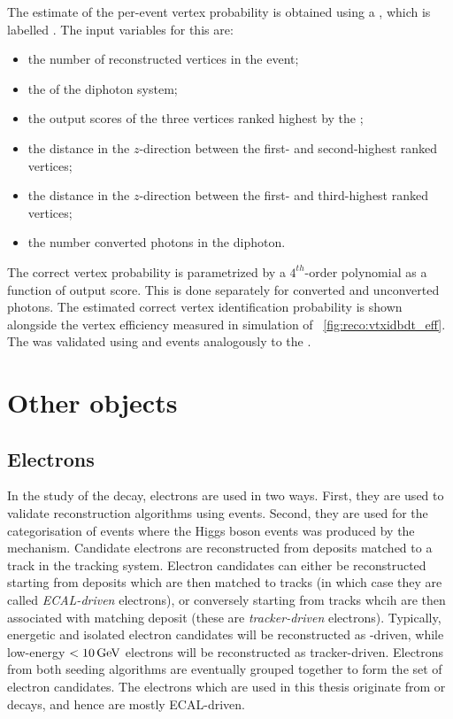 The estimate of the per-event vertex probability is obtained using a \BDT, which is labelled \VtxProbBdt. The input variables for this \BDT are:

\begin{itemize}
\item the number of reconstructed vertices in the event;
\item the \pT of the diphoton system;
\item the output scores of the three vertices ranked highest by the \VtxIdBdt;
\item the distance in the $z$-direction between the first- and second-highest ranked vertices;
\item the distance in the $z$-direction between the first- and third-highest ranked vertices;
\item the number converted photons in the diphoton. 
\end{itemize}

The correct vertex probability is parametrized by a $4^{th}$-order polynomial as a function of \VtxIdBdt output score. This is done separately for converted and unconverted photons. The estimated correct vertex identification probability is shown alongside the vertex efficiency measured in simulation of \Fig~\ref{fig:reco:vtxidbdt_eff}. The \VtxProbBdt was validated using \Zmumu and \gammaJet events analogously to the \VtxIdBdt. 

\section{Other objects} 
\label{reco:sec:other}
\subsection{Electrons}

In the study of the \Hgg decay, electrons are used in two ways. First, they are used to validate reconstruction algorithms using \Zee events. Second, they are used for the categorisation of \Hgg events where the Higgs boson events was produced by the \VH mechanism. Candidate \PF electrons are reconstructed from \ECAL deposits matched to a track in the tracking system. Electron candidates can either be reconstructed starting from \ECAL deposits which are then matched to tracks (in which case they are called \emph{ECAL-driven} electrons), or conversely starting from tracks whcih are then associated with matching \ECAL deposit (these are \emph{tracker-driven} electrons). Typically, energetic and isolated electron candidates will be reconstructed as \ECAL-driven, while low-energy $<10\,\text{Ge\hspace{-.08em}V}$ electrons will be reconstructed as tracker-driven. Electrons from both seeding algorithms are eventually grouped together to form the set of \PF electron candidates. The electrons which are used in this thesis originate from \PWpm or \PZ decays, and hence are mostly ECAL-driven.

